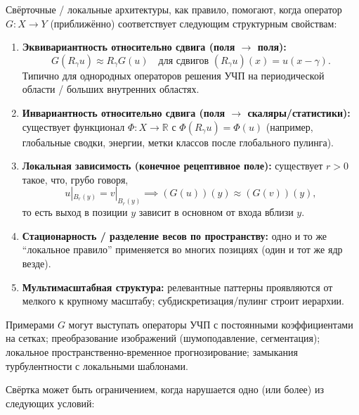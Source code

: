 \documentclass[../NDCNNAI_main.tex]{subfiles}
\begin{document}
Свёрточные / локальные архитектуры, как правило, помогают, когда оператор $G\colon X \to Y$ (приближённо) соответствует следующим структурным свойствам:

\begin{enumerate}
    \item \textbf{Эквивариантность относительно сдвига (поля $\to$ поля):}
    \[
    G(R_\gamma u) \approx R_\gamma G(u) \quad \text{для сдвигов } (R_\gamma u)(x) = u(x - \gamma).
    \]
    Типично для однородных операторов решения УЧП на периодической области / больших внутренних областях.
    
    \item \textbf{Инвариантность относительно сдвига (поля $\to$ скаляры/статистики):} существует функционал $\Phi : X \to \mathbb{R}$ с $\Phi(R_\gamma u) = \Phi(u)$ (например, глобальные сводки, энергии, метки классов после глобального пулинга).
    
    \item \textbf{Локальная зависимость (конечное рецептивное поле):} существует $r > 0$ такое, что, грубо говоря,
    \[
    u|_{B_r(y)} = v|_{B_r(y)} \implies (G(u))(y) \approx (G(v))(y),
    \]
    то есть выход в позиции $y$ зависит в основном от входа вблизи $y$.
    
    \item \textbf{Стационарность / разделение весов по пространству:} одно и то же ``локальное правило'' применяется во многих позициях (один и тот же ядр везде).
    
    \item \textbf{Мультимасштабная структура:} релевантные паттерны проявляются от мелкого к крупному масштабу; субдискретизация/пулинг строит иерархии.
\end{enumerate}

Примерами $G$ могут выступать операторы УЧП с постоянными коэффициентами на сетках; преобразование изображений (шумоподавление, сегментация); локальное пространственно-временное прогнозирование; замыкания турбулентности с локальными шаблонами.

Свёртка может быть ограничением, когда нарушается одно (или более) из следующих условий:
\end{document}
